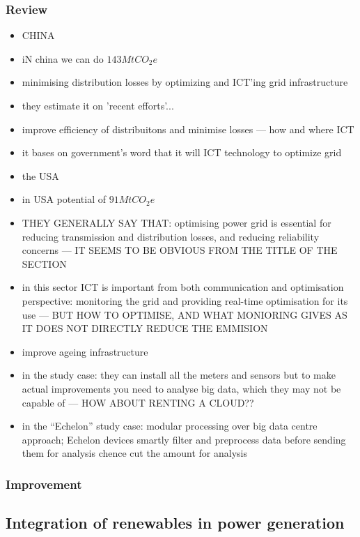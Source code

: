 \documentclass[11pt, twocolumn]{article}
\begin{document}
\subsubsection{Review}
\begin{itemize}
\item CHINA
\item iN china we can do $143 Mt CO_2e$
\item minimising distribution losses by optimizing and ICT'ing grid infrastructure
\item they estimate it on 'recent efforts'...
\item improve efficiency of distribuitons and minimise losses --- how and where ICT
\item it bases on government's word that it will ICT technology to optimize grid

\item the USA
\item in USA potential of $91 MtCO_2e$
\item THEY GENERALLY SAY THAT: optimising power grid is essential for reducing transmission and distribution losses, and reducing reliability concerns --- IT SEEMS TO BE OBVIOUS FROM THE TITLE OF THE SECTION
\item in this sector ICT is important from both communication and optimisation perspective: monitoring the grid and providing real-time optimisation for its use --- BUT HOW TO OPTIMISE, AND WHAT MONIORING GIVES AS IT DOES NOT DIRECTLY REDUCE THE EMMISION
\item improve ageing infrastructure
\item in the study case: they can install all the meters and sensors but to make actual improvements you need to analyse big data, which they may not be capable of --- HOW ABOUT RENTING A CLOUD??
\item in the ``Echelon'' study case: modular processing over big data centre approach; Echelon devices smartly filter and preprocess data before sending them for analysis chence cut the amount for analysis

\end{itemize}
\subsubsection{Improvement}

\subsection{Integration of renewables in power generation}
\end{document}
